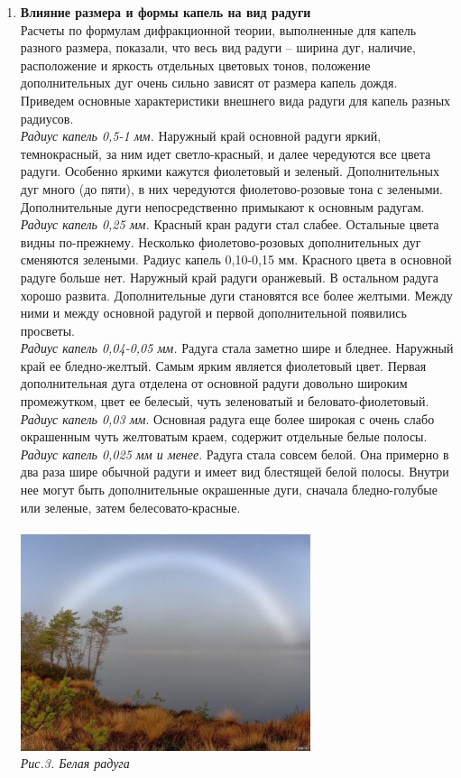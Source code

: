 \documentclass[a4paper]{article}
\begin{document}
\begin{multicols}{2}
\begin{enumerate}
\item \textbf{Влияние размера и формы капель на вид радуги}\\
Расчеты по формулам дифракционной теории, выполненные для капель разного размера, показали, что весь вид радуги – ширина дуг, наличие, расположение и яркость отдельных цветовых тонов, положение дополнительных дуг
очень сильно зависят от размера капель дождя. Приведем основные характеристики внешнего вида радуги для капель разных радиусов.\\
\textit{Радиус капель 0,5-1 мм.} Наружный край основной радуги яркий, темнокрасный, за ним идет светло-красный, и далее чередуются все цвета радуги.
Особенно яркими кажутся фиолетовый и зеленый. Дополнительных дуг много
(до пяти), в них чередуются фиолетово-розовые тона с зелеными. Дополнительные дуги непосредственно примыкают к основным радугам.\\
\textit{Радиус капель 0,25 мм.} Красный кран радуги стал слабее. Остальные цвета
видны по-прежнему. Несколько фиолетово-розовых дополнительных дуг сменяются зелеными.
Радиус капель 0,10-0,15 мм. Красного цвета в основной радуге больше нет.
Наружный край радуги оранжевый. В остальном радуга хорошо развита. Дополнительные дуги становятся все более желтыми. Между ними и между основной радугой и первой дополнительной появились просветы.\\
\textit{Радиус капель 0,04-0,05 мм.} Радуга стала заметно шире и бледнее. Наружный край ее бледно-желтый. Самым ярким является фиолетовый цвет. Первая
дополнительная дуга отделена от основной радуги довольно широким промежутком, цвет ее белесый, чуть зеленоватый и беловато-фиолетовый.\\
\textit{Радиус капель 0,03 мм}. Основная радуга еще более широкая с очень слабо
окрашенным чуть желтоватым краем, содержит отдельные белые полосы.\\
\textit{Радиус капель 0,025 мм и менее}. Радуга стала совсем белой. Она примерно в
два раза шире обычной радуги и имеет вид блестящей белой полосы. Внутри
нее могут быть дополнительные окрашенные дуги, сначала бледно-голубые или
зеленые, затем белесовато-красные.\\
\\
\includegraphics[width=8.5cm]{g3}\\
\textit{Рис.3. Белая радуга}\\
\end{enumerate}
\end{multicols}
\end{document}
